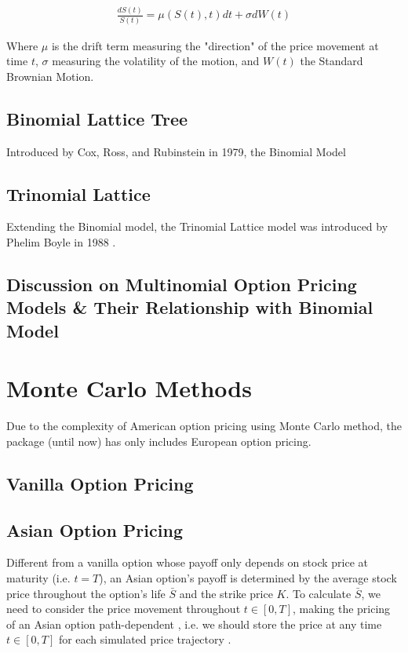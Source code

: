 \begin{align}
\frac{dS(t)}{S(t)} = \mu (S(t), t)dt + \sigma dW(t)
\end{align}

Where $\mu$ is the drift term measuring the "direction" of the price movement at time $t$, $\sigma$ measuring the volatility of the motion, and $W(t)$ the Standard Brownian Motion.



\subsection{Binomial Lattice Tree}

Introduced by Cox, Ross, and Rubinstein in 1979, the Binomial Model


\subsection{Trinomial Lattice}
    
Extending the Binomial model, the Trinomial Lattice model was introduced by Phelim Boyle in 1988 \cite{Boyle1988}.


\subsection{Discussion on Multinomial Option Pricing Models \& Their Relationship with Binomial Model}

\newpage

\section{Monte Carlo Methods}

Due to the complexity of American option pricing using Monte Carlo method, the package (until now) has only includes European option pricing.

\subsection{Vanilla Option Pricing}



\subsection{Asian Option Pricing}

Different from a vanilla option whose payoff only depends on stock price at maturity (i.e. $t = T$), an Asian option's payoff is determined by the average stock price throughout the option's life $\bar{S}$ and the strike price $K$. To calculate $\bar{S}$, we need to consider the price movement throughout $t \in [0, T]$, making the pricing of an Asian option path-dependent , i.e. we should store the price at any time $t \in [0,T]$ for each simulated price trajectory \cite{Higham2004}.

